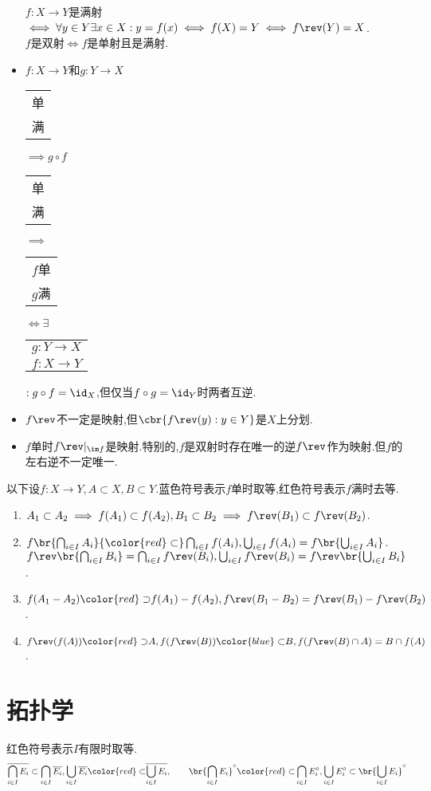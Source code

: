 \documentclass{article}
\begin{document}
\begin{itemize}
    $f:X\to Y$是满射$\iff \forall y\in Y\exists x\in X:y=f(x)\iff f(X)=Y\iff f\rev(Y)=X$.\\
    $f$是双射$\iff f$是单射且是满射.
    \item $f:X\to Y$和$g:Y\to X$\begin{tabular}{l}单\\满\end{tabular}$\implies g\circ f$\begin{tabular}{l}单\\满\end{tabular}$\implies$\begin{tabular}{l}$f$单\\$g$满\end{tabular}$\iff \exists$\begin{tabular}{l}$g:Y\to X$\\$f:X\to Y$\end{tabular}$:g\circ f=\id_X$,但仅当$f\circ g=\id_Y$时两者互逆.
    \item $f\rev$不一定是映射,但$\cbr{f\rev(y):y\in Y}$是$X$上分划.
    \item $f$单时$f\rev|_{\im f}$是映射.特别的,$f$是双射时存在唯一的逆$f\rev$作为映射.但$f$的左右逆不一定唯一.
\end{itemize}

以下设$f:X\to Y, A\subset X, B\subset Y$.蓝色符号表示$f$单时取等,红色符号表示$f$满时去等.
\begin{enumerate}
    \item $A_1\subset A_2\implies f(A_1)\subset f(A_2), B_1\subset B_2\implies f\rev(B_1)\subset f\rev(B_2)$.
    \item $f\br{\bigcap_{i\in I}A_i}{\color{red}\subset} \bigcap_{i\in I}f(A_i), \bigcup_{i\in I}f(A_i)=f\br{\bigcup_{i\in I}A_i}$.$f\rev\br{\bigcap_{i\in I}B_i}=\bigcap_{i\in I}f\rev(B_i), \bigcup_{i\in I}f\rev(B_i)=f\rev\br{\bigcup_{i\in I}B_i}$.
    \item $f(A_1-A_2){\color{red}\supset}f(A_1)-f(A_2), f\rev(B_1-B_2)=f\rev(B_1)-f\rev(B_2)$.
    \item $f\rev(f(A)){\color{red}\supset }A,f(f\rev(B)){\color{blue}\subset}B, f(f\rev(B)\cap A)=B\cap f(A)$.
\end{enumerate}
\section{拓扑学}
红色符号表示$I$有限时取等.
    $$\overline{\bigcap_{i\in I} E_i}\subset \bigcap_{i\in I} \overline{E_i}, \bigcup_{i\in I} \overline{E_i}{\color{red}\subset} \overline{\bigcup_{i\in I} E_i},\qquad \br{\bigcap_{i\in I}E_i}^\circ{\color{red}\subset} \bigcap_{i\in I} E_i^\circ, \bigcup_{i\in I}E_i^\circ\subset \br{\bigcup_{i\in I}E_i}^\circ$$
\end{document}
